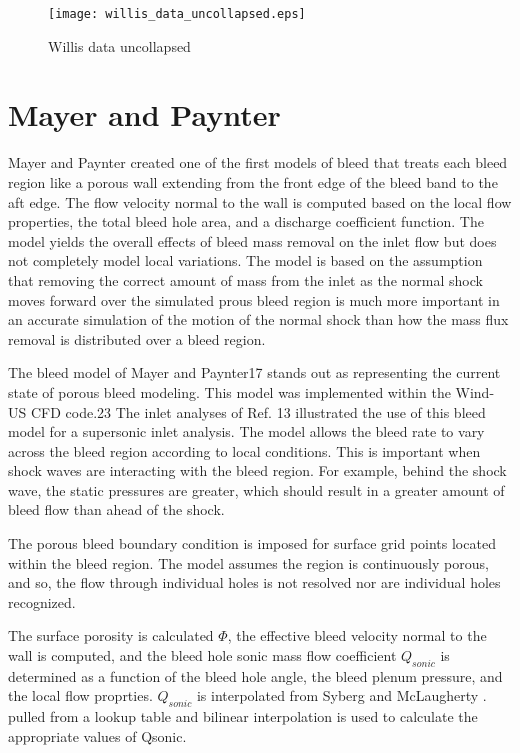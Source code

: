 \begin{figure}[hbtp]
 \begin{center}
    \texttt{[image: willis\_data\_uncollapsed.eps]}
     \caption{Willis data uncollapsed}
     \label{fig:willis_uncollapsed}
 \end{center}
\end{figure}


\section{Mayer and Paynter}

Mayer and Paynter \cite{Mayer1994} created one of the first models of bleed that treats each bleed region like a porous wall extending from the front edge of the bleed band to the aft edge. The flow velocity normal to the wall is computed based on the local flow properties, the total bleed hole area, and a discharge coefficient function. The model yields the overall effects of bleed mass removal on the inlet flow but does not completely model local variations. The model is based on the assumption that removing the correct amount of mass from the inlet as the normal shock moves forward over the simulated prous bleed region is much more important in an accurate simulation of the motion of the normal shock than how the mass flux removal is distributed over a bleed region.

The bleed model of Mayer and Paynter17 stands out as representing the current state of porous bleed modeling. This model was implemented within the Wind-US CFD code.23 The inlet analyses of Ref. 13 illustrated the use of this bleed model for a supersonic inlet analysis. The model allows the bleed rate to vary across the bleed region according to local conditions. This is important when shock waves are interacting with the bleed region. For example, behind the shock wave, the static pressures are greater, which should result in a greater amount of bleed flow than ahead of the shock.

The porous bleed boundary condition is imposed for surface grid points located within the bleed region. The model assumes the region is continuously porous, and so, the flow through individual holes is not resolved nor are individual holes recognized.

The surface porosity is calculated $\Phi$, the effective bleed velocity normal to the wall is computed, and the bleed hole sonic mass flow coefficient $Q_{sonic}$ is determined as a function of the bleed hole angle, the bleed plenum pressure, and the local flow proprties. $Q_{sonic}$ is interpolated from Syberg \cite{Syberg1973} and McLaugherty \cite{McLafferty1958}. pulled from a lookup table and bilinear interpolation is used to calculate the appropriate values of Qsonic. 

